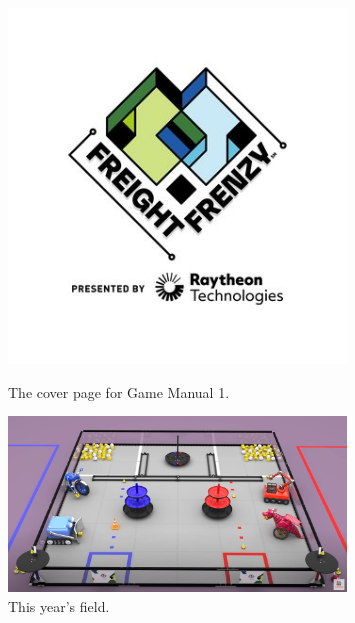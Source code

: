 \begin{figure}[ht]
\centering
\begin{minipage}[b]{.50\textwidth}
  \centering
  \includegraphics[width=0.8\textwidth]{Meetings/September/09-21-21/9-18-21_Team_Image1 - Nathan Forrer.jpg}
  \caption{The cover page for Game Manual 1.}
  \label{fig:pic1}
\end{minipage}%
\hfill%
\begin{minipage}[b]{.50\textwidth}
  \centering
  \includegraphics[width=0.8\textwidth]{Meetings/September/09-21-21/9-18-21_Team_Image2 - Nathan Forrer.jpg}
  \caption{This year's field.}
  \label{fig:pic2}
\end{minipage}
\end{figure}

